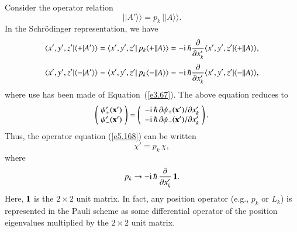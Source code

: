 Consider the operator relation
\begin{equation}\label{e5.168}
||A'\rangle\rangle = p_k\, ||A\rangle\rangle.
\end{equation}
In the Schr\"{o}dinger representation, we have
\begin{align}
\langle x', y', z'|\langle + |A'\rangle\rangle& =
\langle x', y', z'|\,p_k \langle +||A\rangle\rangle = -{\rm i}\,\hbar\frac{\partial}
{\partial x_k'} \langle x', y', z'| \langle +||A\rangle\rangle,\\[0.5ex]
\langle x', y', z'|\langle - |A'\rangle\rangle& =
\langle x', y', z'|\,p_k \langle -||A\rangle\rangle= -{\rm i}\,\hbar\frac{\partial}
{\partial x_k'} \langle x', y', z'| \langle -||A\rangle\rangle,
\end{align}
where use has been made of Equation~(\ref{e3.67}). The above equation reduces to
\begin{equation}
\left(\! \begin{array}{c} \psi_+'({\bf x}')\\
\psi_-' ({\bf x}') \end{array}\!\right) = 
\left(\begin{array}{c} -{\rm i}\,\hbar \,\partial \psi_+({\bf x}') /\partial x_k'\\
 -{\rm i}\,\hbar \,\partial \psi_-({\bf x}')/\partial x_k'\end{array}\!\right).
\end{equation}
Thus, the operator equation (\ref{e5.168})
can be written
\begin{equation}
\chi' = p_k\, \chi,
\end{equation}
where 
\begin{equation}\label{e5.172}
p_k \rightarrow -{\rm i}\,\hbar\,\frac{\partial}{\partial x_k'}\, {\bf 1}.
\end{equation}
Here, ${\bf 1}$ is the $2\times 2$ unit matrix. In fact, any position operator
({\rm e.g.}, $p_k$ or $L_k$) is represented in the Pauli scheme as some differential
operator of the position eigenvalues multiplied by the $2\times2$ unit matrix. 

